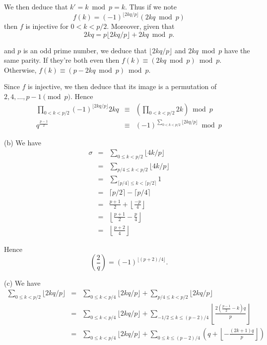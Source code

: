 \documentclass[a4paper,12pt]{article}
\newcommand{\subpar}[1]{\medskip \noindent (#1)}
\begin{document}
We then deduce that $k' = k\bmod p = k$.  Thus if we note
\[ f(k) = (-1)^{\lfloor 2kq/p\rfloor}(2kq\bmod p)\]
then $f$ is injective for $0 < k < p/2$.  Moreover, given that
\[ 2kq = p\lfloor 2kq/p\rfloor + 2kq \bmod p.\]

and $p$ is an odd prime number, we deduce that $\lfloor 2kq/p\rfloor$
and $2kq \bmod p$ have the same parity.  If they're both even then
$f(k) \equiv (2kq \bmod p) \bmod p$.  Otherwise, $f(k) \equiv (p - 2kq
\bmod p) \bmod p$.

Since $f$ is injective, we then deduce that its image is a permutation
of $2, 4, \ldots, p-1 \pmod p$.  Hence
\begin{eqnarray*}
  \prod_{0 < k < p/2} (-1)^{\lfloor 2kq/p\rfloor} 2kq
  &\equiv& \left(\prod_{0 < k <p/2} 2k \right) \bmod p \\
  q^{\frac{p-1}{2}} &\equiv& (-1)^{\sum_{0<k<p/2} \lfloor
    2kq/p\rfloor} \bmod p
\end{eqnarray*}

\subpar{b} We have
\begin{eqnarray*}
  \sigma &=& \sum_{0 \le k<p/2}\lfloor 4k/p\rfloor \\
  &=& \sum_{p/4 \le k < p/2} \lfloor 4k/p\rfloor \\
  &=& \sum_{\lceil p/4\rceil \le k < \lceil p/2\rceil} 1 \\
  &=& \lceil p/2\rceil - \lceil p/4\rceil \\
  &=& \frac{p+1}{2} + \left\lfloor \frac{-p}{4}\right\rfloor \\
  &=& \left\lfloor \frac{p+1}{2} - \frac{p}{4}\right\rfloor \\
  &=& \left\lfloor \frac{p+2}{4}\right\rfloor
\end{eqnarray*}

Hence \[ \left(\frac{2}{q}\right) = (-1)^{\lfloor (p+2)/4\rfloor}.\]

\subpar{c} We have
\begin{eqnarray*}
  \sum_{0\le k<p/2} \lfloor 2kq/p\rfloor &=&
  \sum_{0\le k<p/4} \lfloor 2kq/p\rfloor + \sum_{p/4\le k<p/2} \lfloor
  2kq/p\rfloor \\
  &=& \sum_{0\le k<p/4} \lfloor 2kq/p\rfloor +
  \sum_{-1/2 \le k \le (p-2)/4} \left\lfloor \frac{2\left(\frac{p-1}{2} -
    k\right)q}{p}\right\rfloor \\
  &=& \sum_{0\le k<p/4} \lfloor 2kq/p\rfloor +
  \sum_{0\le k\le (p-2)/4} \left( q + \left\lfloor
  -\frac{(2k+1)q}{p}\right\rfloor\right)
\end{eqnarray*}
\end{document}

